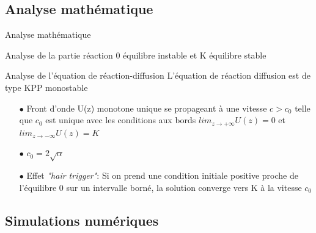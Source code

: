 \documentclass[10pt]{beamer}
\begin{document}
\subsection{Analyse mathématique}
\begin{frame}{Analyse mathématique}
	\begin{block}{Analyse de la partie réaction}
	 0 équilibre instable et K équilibre stable
		
	\end{block}
	
	\begin{block}{Analyse de l'équation de réaction-diffusion}
	 L'équation de réaction diffusion est de type KPP monostable
		\begin{itemize}
		
			\item[$\bullet$] Front d'onde U(z) monotone unique se propageant à une vitesse $c> c_0$ telle que $c_0$ est unique avec les conditions aux bords $lim_{z \to + \infty}U(z) =0$ et  $lim_{z \to - \infty} U(z)=K$
			\vspace{0.1cm}
			\item[$\bullet$] $c_0 =2 \sqrt{\alpha}$
			
			\vspace{0.5cm}
			
			\item[$\bullet$] Effet \textit{"hair trigger"}: Si on prend une condition initiale positive proche de l'équilibre 0 sur un intervalle borné, la solution converge vers K à la vitesse $c_0$ 
			
		\end{itemize}
	\end{block}	
	
	

\end{frame}


\subsection{Simulations numériques}
\end{document}

